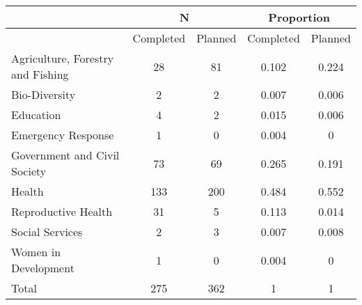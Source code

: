  \begin{tabular}{l cc cc}  & \multicolumn{2}{c}{N} & \multicolumn{2}{c}{Proportion} \\  \hline  & Completed & Planned & Completed & Planned \\ \hline Agriculture, Forestry and Fishing  &  28  &  81  &  0.102  &  0.224  \\ 
 Bio-Diversity  &  2  &  2  &  0.007  &  0.006  \\ 
 Education  &  4  &  2  &  0.015  &  0.006  \\ 
 Emergency Response  &  1  &  0  &  0.004  &  0  \\ 
 Government and Civil Society  &  73  &  69  &  0.265  &  0.191  \\ 
 Health  &  133  &  200  &  0.484  &  0.552  \\ 
 Reproductive Health  &  31  &  5  &  0.113  &  0.014  \\ 
 Social Services  &  2  &  3  &  0.007  &  0.008  \\ 
 Women in Development  &  1  &  0  &  0.004  &  0  \\ 
  \hline Total &  275  &  362  &  1 & 1 \\ \hline  \end{tabular} 